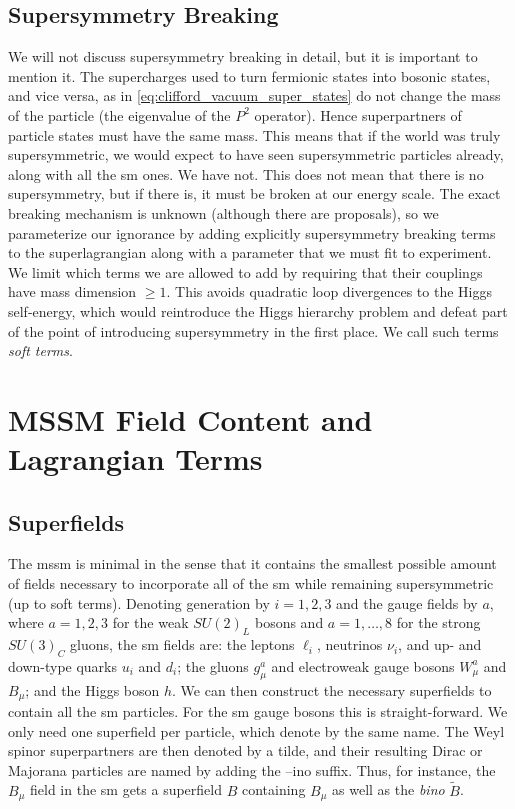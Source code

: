 \subsection{Supersymmetry Breaking}

We will not discuss supersymmetry breaking in detail, but it is important to mention it.
The supercharges used to turn fermionic states into bosonic states, and vice versa, as in \cref{eq:clifford_vacuum_super_states} do not change the mass of the particle (the eigenvalue of the $P^2$ operator).
Hence superpartners of particle states must have the same mass.
This means that if the world was truly supersymmetric, we would expect to have seen supersymmetric particles already, along with all the \gls{sm} ones. We have not.
This does not mean that there is no supersymmetry, but if there is, it must be broken at our energy scale. The exact breaking mechanism is unknown (although there are proposals), so we parameterize our ignorance by adding explicitly supersymmetry breaking terms to the superlagrangian along with a parameter that we must fit to experiment.
We limit which terms we are allowed to add by requiring that their couplings have mass dimension $\geq 1$. This avoids quadratic loop divergences to the Higgs self-energy, which would reintroduce the Higgs hierarchy problem and defeat part of the point of introducing supersymmetry in the first place. We call such terms \emph{soft terms}.


\section{MSSM Field Content and Lagrangian Terms}

\subsection{Superfields}

The \gls{mssm} is minimal in the sense that it contains the smallest possible amount of fields necessary to incorporate all of the \gls{sm} while remaining supersymmetric (up to soft terms). Denoting generation by $i=1,2,3$ and the gauge fields by $a$, where $a=1,2,3$ for the weak $SU(2)_L$ bosons and $a=1,\ldots,8$ for the strong $SU(3)_C$ gluons, the \gls{sm} fields are: the leptons $\ell_i$, neutrinos $\nu_i$, and up- and down-type quarks $u_i$ and $d_i$; the gluons $g^a_\mu$ and electroweak gauge bosons $W^a_\mu$ and $B_\mu$; and the Higgs boson $h$.
We can then construct the necessary superfields to contain all the \gls{sm} particles.
For the \gls{sm} gauge bosons this is straight-forward. We only need one superfield per particle, which denote by the same name. The Weyl spinor superpartners are then denoted by a tilde, and their resulting Dirac or Majorana particles are named by adding the --ino suffix. Thus, for instance, the $B_\mu$ field in the \gls{sm} gets a superfield $B$ containing $B_\mu$ as well as the \emph{bino} $\tilde{B}$.

